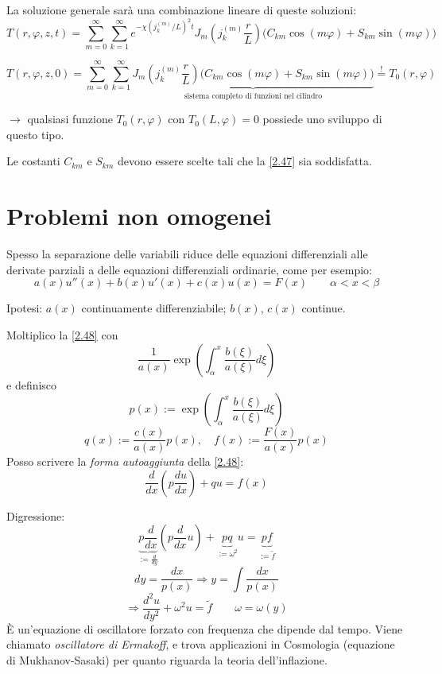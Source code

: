 \documentclass[a4paper,11pt]{report}
\begin{document}
La soluzione generale sar\`a una combinazione lineare di queste soluzioni:
\begin{equation}
T(r,\varphi,z,t)=\sum_{m=0}^{\infty}\sum_{k=1}^\infty e^{-\chi \left( j_k^{(m)} /L \right)^2t} J_m\left(j_k^{(m)}\frac{r}{L}\right) \big(C_{km}\cos (m\varphi) + S_{km}\sin (m\varphi)\big)
\end{equation}

\begin{equation}
T(r,\varphi,z,0)=\sum_{m=0}^{\infty}\sum_{k=1}^\infty \underbrace{J_m\left(j_k^{(m)}\frac{r}{L}\right) \big(C_{km}\cos (m\varphi) + S_{km}\sin (m\varphi)\big)}_\text{sistema completo di funzioni nel cilindro}
\overset{!}{=}T_0(r, \varphi)
\label{2.47}
\end{equation}

$\rightarrow$ qualsiasi funzione $T_0(r,\varphi)$ con $T_0(L,\varphi)=0$ possiede uno sviluppo di questo tipo.

Le costanti $C_{km}$ e $S_{km}$ devono essere scelte tali che la \eqref{2.47} sia soddisfatta.

\section{Problemi non omogenei}

Spesso la separazione delle variabili riduce delle equazioni differenziali alle derivate parziali a delle equazioni differenziali ordinarie, come per esempio:
\begin{equation}
a(x)u''(x) + b(x)u'(x)+c(x)u(x)=F(x) \qquad \alpha<x<\beta
\label{2.48}
\end{equation}

Ipotesi: $a(x)$ continuamente differenziabile; $b(x)$, $c(x)$ continue. 

Moltiplico la \eqref{2.48} con 
\[
\frac{1}{a(x)}\exp\left(\int_\alpha^x\frac{b(\xi)}{a(\xi)}d\xi\right)
\]
e definisco
\[
p(x):= \exp\left(\int_\alpha^x \frac{b(\xi)}{a(\xi)}d\xi\right)
\]
\[
q(x):=\frac{c(x)}{a(x)}p(x),\quad f(x):=\frac{F(x)}{a(x)}p(x)
\]
Posso scrivere la \emph{forma autoaggiunta} della \eqref{2.48}:
\begin{equation}
\frac{d}{dx}\left(p\frac{du}{dx}\right) + qu = f(x)
\end{equation}

\medskip

Digressione:
\[
\underbrace{p\frac{d}{dx}}_{:=\frac{d}{dy}} \left( p\frac{d}{dx}u\right)+\underbrace{pq}_{:=\omega^2}u=\underbrace{pf}_{:=\tilde{f}}
\]
 \[
dy=\frac{dx}{p(x)} \Rightarrow y=\int \frac{dx}{p(x)} 
\]
\[
\Rightarrow \frac{d^2u}{dy^2}+\omega^2 u=\tilde{f} \qquad \omega=\omega(y)
\]
\`E un'equazione di oscillatore forzato con frequenza che dipende dal tempo.
Viene chiamato \emph{oscillatore di Ermakoff}, e trova applicazioni in Cosmologia (equazione di Mukhanov-Sasaki) per quanto riguarda la teoria dell'inflazione.
\end{document}

